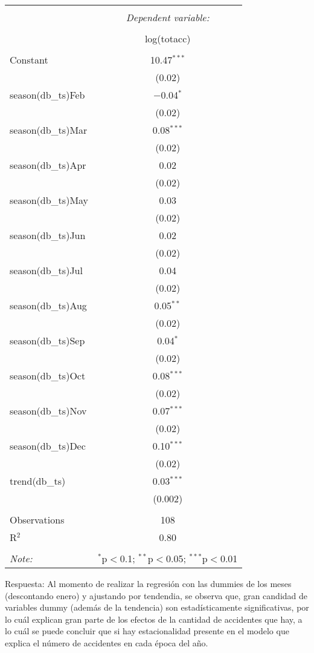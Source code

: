 \documentclass[
]{article}
\begin{document}
\begin{table}[!htbp] \centering 
  \caption{} 
  \label{} 
\begin{tabular}{@{\extracolsep{5pt}}lc} 
\\[-1.8ex]\hline 
\hline \\[-1.8ex] 
 & \multicolumn{1}{c}{\textit{Dependent variable:}} \\ 
\cline{2-2} 
\\[-1.8ex] & log(totacc) \\ 
\hline \\[-1.8ex] 
 Constant & 10.47$^{***}$ \\ 
  & (0.02) \\ 
  season(db\_ts)Feb & $-$0.04$^{*}$ \\ 
  & (0.02) \\ 
  season(db\_ts)Mar & 0.08$^{***}$ \\ 
  & (0.02) \\ 
  season(db\_ts)Apr & 0.02 \\ 
  & (0.02) \\ 
  season(db\_ts)May & 0.03 \\ 
  & (0.02) \\ 
  season(db\_ts)Jun & 0.02 \\ 
  & (0.02) \\ 
  season(db\_ts)Jul & 0.04 \\ 
  & (0.02) \\ 
  season(db\_ts)Aug & 0.05$^{**}$ \\ 
  & (0.02) \\ 
  season(db\_ts)Sep & 0.04$^{*}$ \\ 
  & (0.02) \\ 
  season(db\_ts)Oct & 0.08$^{***}$ \\ 
  & (0.02) \\ 
  season(db\_ts)Nov & 0.07$^{***}$ \\ 
  & (0.02) \\ 
  season(db\_ts)Dec & 0.10$^{***}$ \\ 
  & (0.02) \\ 
  trend(db\_ts) & 0.03$^{***}$ \\ 
  & (0.002) \\ 
 \hline \\[-1.8ex] 
Observations & 108 \\ 
R$^{2}$ & 0.80 \\ 
\hline 
\hline \\[-1.8ex] 
\textit{Note:}  & \multicolumn{1}{r}{$^{*}$p$<$0.1; $^{**}$p$<$0.05; $^{***}$p$<$0.01} \\ 
\end{tabular} 
\end{table}

Respuesta: Al momento de realizar la regresión con las dummies de los
meses (descontando enero) y ajustando por tendendia, se observa que,
gran candidad de variables dummy (además de la tendencia) son
estadísticamente significativas, por lo cuál explican gran parte de los
efectos de la cantidad de accidentes que hay, a lo cuál se puede
concluir que si hay estacionalidad presente en el modelo que explica el
número de accidentes en cada época del año.
\end{document}
